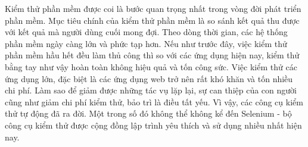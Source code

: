 \documentclass[./../main_file.tex]{subfiles}
\begin{document}
	Kiểm thử phần mềm được coi là bước quan trọng nhất trong vòng đời phát triển phần mềm. Mục tiêu chính của kiểm thử phần mềm là so sánh kết quả thu được với kết quả mà người dùng cuối mong đợi. Theo dòng thời gian, các hệ thống phần mềm ngày càng lớn và phức tạp hơn. Nếu như trước đây, việc kiểm thử phần mềm hầu hết đều làm thủ công thì so với các ứng dụng hiện nay, kiểm thử bằng tay như vậy hoàn toàn không hiệu quả và tốn công sức. Việc kiểm thử các ứng dụng lớn, đặc biệt là các ứng dụng web trở nên rất khó khăn và tốn nhiều chi phí. Làm sao để giảm được những tác vụ lặp lại, sự can thiệp của con người cũng như giảm chi phí kiểm thử, bảo trì là điều tất yếu. Vì vậy, các công cụ kiểm thử tự động đã ra đời. Một trong số đó không thể không kể đến Selenium - bộ công cụ kiểm thử được cộng đồng lập trình yêu thích và sử dụng nhiều nhất hiện nay.
\end{document}

